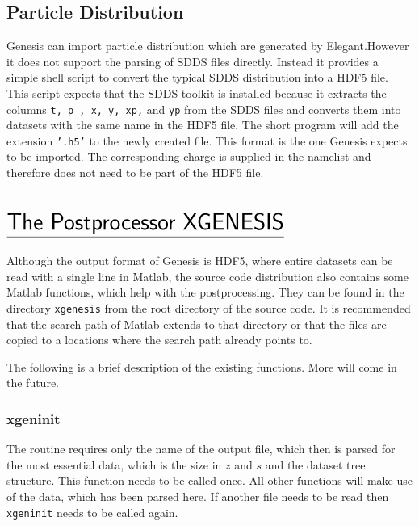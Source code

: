 \documentclass[12pt]{book}
\begin{document}
\section{\sf Particle Distribution}

Genesis can import particle distribution which are generated by Elegant.However it does not support the parsing of SDDS files directly. Instead it provides a simple shell script to convert the typical SDDS distribution into a HDF5 file. This script expects that the SDDS toolkit is installed because it extracts the columns {\tt t, p , x, y, xp,} and {\tt yp} from the SDDS files and converts them into datasets with the same name in the HDF5 file. The short program will add the extension {\tt '.h5'} to the newly created file. This format is the one Genesis expects to be imported. The corresponding charge is supplied in the namelist and therefore does not need to be part of the HDF5 file.

 

\chapter*{\vspace{-3cm}$\underline{\mbox{\rule[-0.5em]{0cm}{1em}\huge\sf The Postprocessor XGENESIS}}$}
 
Although the output format of Genesis is HDF5, where entire datasets can be read with a single line in Matlab, the source code distribution also contains some Matlab functions, which help with the postprocessing. They can be found in the directory  {\tt xgenesis} from the root directory of the source code. It is recommended that the search path of Matlab extends to that directory or that the files are copied to a locations where the search path already points to.

The following is a brief description of the existing functions. More will come in the future.

\subsection{\sf xgeninit}

The routine requires only the name of the output file, which then is parsed for the most essential data, which is the size in $z$ and $s$ and the dataset tree structure. This function needs to be called once. All other functions will make use of the data, which has been parsed here. If another file needs to be read then {\tt xgeninit} needs to be called again.
\end{document}
